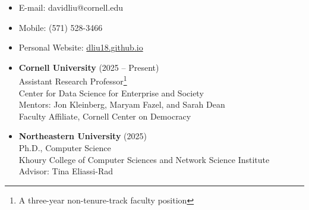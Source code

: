 \documentclass[margin]{res}
\begin{document}
 


\begin{resume} 

 

\begin{itemize}\itemsep -1pt  %
\section{Contact Information}
\item[] E-mail: davidliu@cornell.edu
\item[] Mobile: (571) 528-3466
\item[] Personal Website: \href{https://dliu18.github.io}{dliu18.github.io}
\end{itemize}

\begin{itemize}
\section{Academic Appointments} 
\item[]
\textbf{Cornell University} (2025 -- Present)\\
Assistant Research Professor\footnote{A three-year non-tenure-track faculty position}\\
Center for Data Science for Enterprise and Society \\
Mentors: Jon Kleinberg, Maryam Fazel, and Sarah Dean\\
Faculty Affiliate, Cornell Center on Democracy
\end{itemize}

\begin{itemize}
\section{Education} 
\item[]
\textbf{Northeastern University} (2025)\\
Ph.D., Computer Science\\
Khoury College of Computer Sciences and Network Science Institute\\
Advisor: Tina Eliassi-Rad\\


\end{itemize}
\end{resume}
\end{document}
